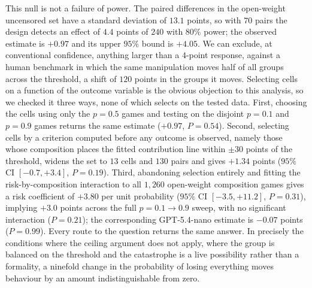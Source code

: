 \documentclass[openacc]{rsproca_new}
\begin{document}
This null is not a failure of power. The paired differences in the open-weight uncensored set have a standard deviation of $13.1$ points, so with $70$ pairs the design detects an effect of $4.4$ points of $240$ with $80\%$ power; the observed estimate is $+0.97$ and its upper $95\%$ bound is $+4.05$. We can exclude, at conventional confidence, anything larger than a $4$-point response, against a human benchmark in which the same manipulation moves half of all groups across the threshold, a shift of $120$ points in the groups it moves. Selecting cells on a function of the outcome variable is the obvious objection to this analysis, so we checked it three ways, none of which selects on the tested data. First, choosing the cells using only the $p=0.5$ games and testing on the disjoint $p=0.1$ and $p=0.9$ games returns the same estimate ($+0.97$, $P=0.54$). Second, selecting cells by a criterion computed before any outcome is observed, namely those whose composition places the fitted contribution line within $\pm30$ points of the threshold, widens the set to $13$ cells and $130$ pairs and gives $+1.34$ points ($95\%$ CI $[-0.7,+3.4]$, $P=0.19$). Third, abandoning selection entirely and fitting the risk-by-composition interaction to all $1{,}260$ open-weight composition games gives a risk coefficient of $+3.80$ per unit probability ($95\%$ CI $[-3.5,+11.2]$, $P=0.31$), implying $+3.0$ points across the full $p=0.1\to0.9$ sweep, with no significant interaction ($P=0.21$); the corresponding GPT-5.4-nano estimate is $-0.07$ points ($P=0.99$). Every route to the question returns the same answer. In precisely the conditions where the ceiling argument does not apply, where the group is balanced on the threshold and the catastrophe is a live possibility rather than a formality, a ninefold change in the probability of losing everything moves behaviour by an amount indistinguishable from zero.
\end{document}
